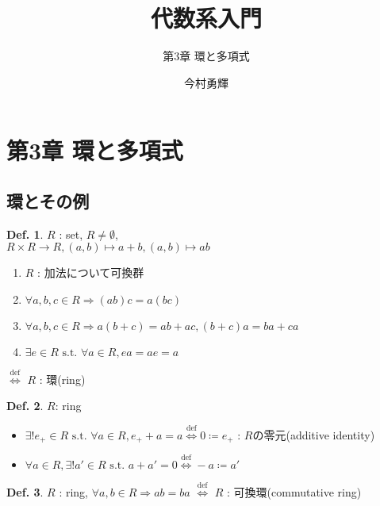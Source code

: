 \documentclass[uplatex,dvipdfmx,9pt]{beamer}
\title{代数系入門}
\subtitle{第3章 環と多項式}
\author{今村勇輝}
\newcommand{\defarrow}{\overset{\mathrm{def}}{\Leftrightarrow}}
\newcommand{\st}{\text{ s.t. }}
\newcommand{\sscount}{\textsection \thesubsection}
\newcounter{textExmCount}
\theoremstyle{definition} %
\newtheorem{defn}{Def.}[subsection] %
\theoremstyle{example}
\begin{document}
  \begin{frame}[plain]
    \titlepage
  \end{frame}

  \section{第3章 環と多項式}

    \subsection{\sscount 環とその例}
    \setcounter{textExmCount}{0}

      \begin{frame}

        \begin{defn}
          $R$ : set, $R \ne \emptyset$, \\
          $R \times R \to R, (a, b) \mapsto a + b, (a, b) \mapsto ab$
          \begin{enumerate}
            \item $R$ : 加法について可換群
            \item $\forall a, b, c \in R \Rightarrow (ab)c = a(bc)$
            \item $\forall a, b, c \in R \Rightarrow a(b + c) = ab + ac, (b + c)a = ba + ca$
            \item $\exists e \in R \st \forall a \in R, ea = ae = a$
          \end{enumerate}
          $\defarrow$ $R$ : \alert{環(ring)}
        \end{defn}

        \begin{defn}
          $R$: ring \\
          \begin{itemize}
            \item $\exists! e_+ \in R \st \forall a \in R, e_+ + a = a \defarrow 0 \coloneqq e_+$ : $R$の\alert{零元(additive identity)}
            \item $\forall a \in R, \exists! a' \in R \st a + a' = 0 \defarrow -a \coloneqq a'$
          \end{itemize}
        \end{defn}

        \begin{defn}
          $R$ : ring, $\forall a, b \in R \Rightarrow ab = ba$ $\defarrow$ $R$ : \alert{可換環(commutative ring)}
        \end{defn}

      \end{frame}
\end{document}
